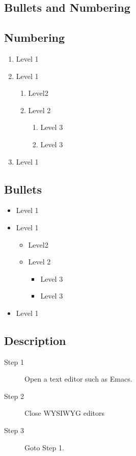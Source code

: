 \subsection{Bullets and Numbering}

\subsection{Numbering}
 
 
 \begin{enumerate}
  \item Level 1
  \item Level 1
  		\begin{enumerate}
  		 \item Level2
  		 \item Level 2
  		 		\begin{enumerate}
  		 		\item Level 3
  		 		\item Level 3
  				\end{enumerate}
  		\end{enumerate}
 \item Level 1
 \end{enumerate}
 
 \subsection{Bullets}
 
\begin{itemize}
  \item Level 1
  \item Level 1
  		\begin{itemize}
  		 \item Level2
  		 \item Level 2
  		 		\begin{itemize}
  		 		\item Level 3
  		 		\item Level 3
  				\end{itemize}
  		\end{itemize}
 \item Level 1
 \end{itemize}
 
 \subsection{Description}
 
 \begin{description}
  \item [Step 1] Open a text editor such as Emacs.
  \item [Step 2] Close WYSIWYG editors
  \item [Step 3] Goto Step 1.
 \end{description}
 
